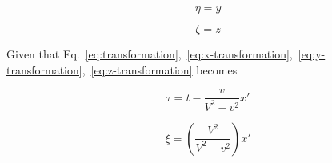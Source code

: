 \begin{equation}
    \eta = y
\end{equation}

\begin{equation}
    \zeta = z
\end{equation}

Given that Eq.~\ref{eq:transformation},~\ref{eq:x-transformation},~\ref{eq:y-transformation},~\ref{eq:z-transformation} becomes

\begin{equation}
    \tau = t - \frac{v}{V^2 - v^2} x'
\end{equation}

\begin{equation}
    \xi = \left( \frac{V^2}{V^2 - v^2} \right) x'
\end{equation}

